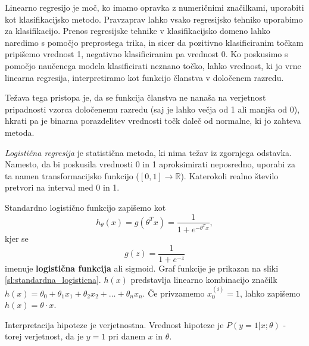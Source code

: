 \documentclass[11pt,a4paper,openany]{book}
\begin{document}
Linearno regresijo je moč, ko imamo opravka z numeričnimi značilkami, uporabiti kot klasifikacijsko metodo. Pravzaprav lahko vsako regresijsko tehniko uporabimo za klasifikacijo. Prenos regresijske tehnike v klasifikacijsko domeno lahko naredimo s pomočjo preprostega trika, in sicer da pozitivno klasificiranim točkam pripišemo vrednost 1, negativno klasificiranim pa vrednost 0. Ko poskusimo s pomočjo naučenega modela klasificirati neznano točko, lahko vrednost, ki jo vrne linearna regresija, interpretiramo kot funkcijo članstva v določenem razredu. \cite{Witten2005}

Težava tega pristopa je, da se funkcija članstva ne nanaša na verjetnost pripadnosti vzorca določenemu razredu (saj je lahko večja od 1 ali manjša od 0), hkrati pa je binarna porazdelitev vrednosti točk daleč od normalne, ki jo zahteva metoda.


\textit{Logistična regresija} je statistična metoda, ki nima težav iz zgornjega odstavka. Namesto, da bi poskusila vrednosti 0 in 1 aproksimirati neposredno, uporabi za ta namen transformacijsko funkcijo ($[0, 1] \rightarrow \mathbb{R}$). Katerokoli realno število pretvori na interval med 0 in 1.

Standardno logistično funkcijo zapišemo kot
\begin{equation}
	\label{en:standardna_log_funkcija}
	h_\theta(x) = g(\theta^Tx) = \frac{1}{1 + e^{-\theta^Tx}},
\end{equation}
kjer se
\begin{equation}
	g(z) = \frac{1}{1 + e^{-z}}
\end{equation}
imenuje \textbf{logistična funkcija} ali {sigmoid}. Graf funkcije je prikazan na sliki \ref{sl:standardna_logisticna}.
$h(x)$ predstavlja linearno kombinacijo značilk $h(x) = \theta_0 + \theta_1x_1 + \theta_2x_2 + \dots + \theta_nx_n$. Če privzamemo $x_0^{(i)} = 1$, lahko zapišemo $h(x) = \theta \cdot x$.

Interpretacija hipoteze je verjetnostna. Vrednost hipoteze je $P(y=1|x;\theta)$ - torej verjetnost, da je $y = 1$ pri danem $x$ in $\theta$.
\end{document}
